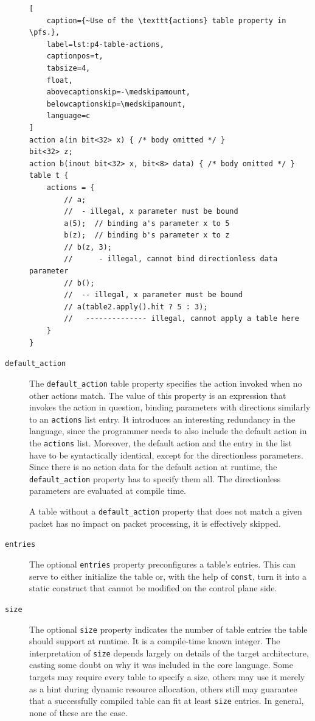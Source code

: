 \begin{description}
\begin{lstlisting}[
	caption={~Use of the \texttt{actions} table property in \pfs.},
	label=lst:p4-table-actions,
	captionpos=t,
	tabsize=4,
	float,
	abovecaptionskip=-\medskipamount,
	belowcaptionskip=\medskipamount,
	language=c
]
action a(in bit<32> x) { /* body omitted */ }
bit<32> z;
action b(inout bit<32> x, bit<8> data) { /* body omitted */ }
table t {
	actions = {
		// a;
		//  - illegal, x parameter must be bound
		a(5);  // binding a's parameter x to 5
		b(z);  // binding b's parameter x to z
		// b(z, 3);
		//      - illegal, cannot bind directionless data parameter
		// b();
		//  -- illegal, x parameter must be bound
		// a(table2.apply().hit ? 5 : 3);
		//   -------------- illegal, cannot apply a table here
	}
}
\end{lstlisting}

\item[\texttt{default\_action}] The \texttt{default\_action} table property
specifies the action invoked when no other actions match. The value of this
property is an expression that invokes the action in question, binding
parameters with directions similarly to an \texttt{actions} list entry. It
introduces an interesting redundancy in the \pfs language, since the programmer
needs to also include the default action in the \texttt{actions} list. Moreover,
the default action and the entry in the list have to be syntactically identical,
except for the directionless parameters. Since there is no action data for the
default action at runtime, the \texttt{default\_action} property has to specify
them all. The directionless parameters are evaluated at compile time.

A table without a \texttt{default\_action} property that does not match a given
packet has no impact on packet processing, it is effectively skipped.

\item[\texttt{entries}] The optional \texttt{entries} property preconfigures a
table's entries. This can serve to either initialize the table or, with the help
of \texttt{const}, turn it into a static construct that cannot be modified on
the control plane side.

\item[\texttt{size}] The optional \texttt{size} property indicates the number of
table entries the table should support at runtime. It is a compile-time known
integer. The interpretation of \texttt{size} depends largely on details of the
target architecture, casting some doubt on why it was included in the core
language. Some targets may require every table to specify a size, others may use
it merely as a hint during dynamic resource allocation, others still may
guarantee that a successfully compiled table can fit at least \texttt{size}
entries. In general, none of these are the case.

\end{description}

